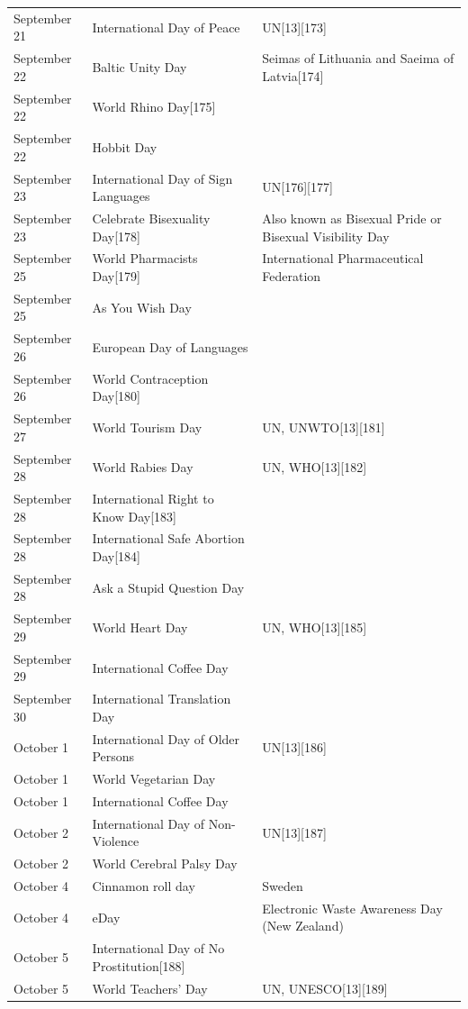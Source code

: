 \documentclass[
  openany]{book}
\begin{document}
\begin{longtable}[t]{>{\raggedright\arraybackslash}p{8em}>{\raggedright\arraybackslash}p{20em}>{\raggedright\arraybackslash}p{12em}}
September 21 & International Day of Peace & UN[13][173]\\
\addlinespace
September 22 & Baltic Unity Day & Seimas of Lithuania and Saeima of Latvia[174]\\
September 22 & World Rhino Day[175] & \\
September 22 & Hobbit Day & \\
September 23 & International Day of Sign Languages & UN[176][177]\\
September 23 & Celebrate Bisexuality Day[178] & Also known as Bisexual Pride or Bisexual Visibility Day\\
\addlinespace
September 25 & World Pharmacists Day[179] & International Pharmaceutical Federation\\
September 25 & As You Wish Day & \\
September 26 & European Day of Languages & \\
September 26 & World Contraception Day[180] & \\
September 27 & World Tourism Day & UN, UNWTO[13][181]\\
\addlinespace
September 28 & World Rabies Day & UN, WHO[13][182]\\
September 28 & International Right to Know Day[183] & \\
September 28 & International Safe Abortion Day[184] & \\
September 28 & Ask a Stupid Question Day & \\
September 29 & World Heart Day & UN, WHO[13][185]\\
\addlinespace
September 29 & International Coffee Day & \\
September 30 & International Translation Day & \\
October 1 & International Day of Older Persons & UN[13][186]\\
October 1 & World Vegetarian Day & \\
October 1 & International Coffee Day & \\
\addlinespace
October 2 & International Day of Non-Violence & UN[13][187]\\
October 2 & World Cerebral Palsy Day & \\
October 4 & Cinnamon roll day & Sweden\\
October 4 & eDay & Electronic Waste Awareness Day (New Zealand)\\
October 5 & International Day of No Prostitution[188] & \\
\addlinespace
October 5 & World Teachers' Day & UN, UNESCO[13][189]\\

\end{longtable}
\end{document}

